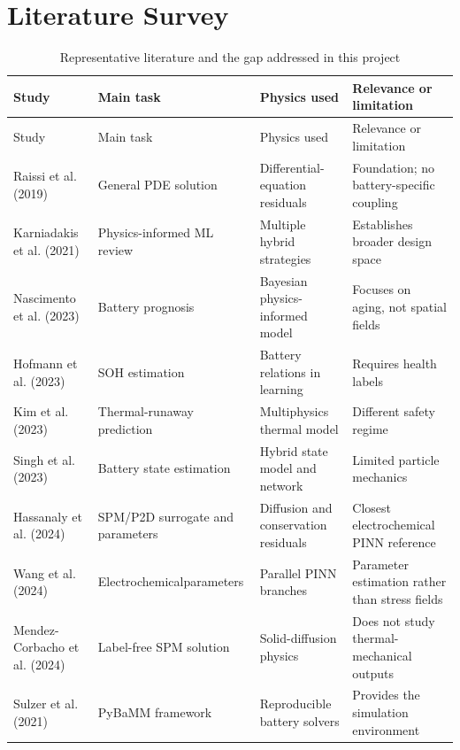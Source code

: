 \documentclass[14pt,a4paper,oneside]{extreport}
\renewcommand{\arraystretch}{1.25}
\begin{document}
\section{Literature Survey}
\begingroup
\small
{}
\renewcommand{\arraystretch}{0.95}
\begin{longtable}{@{}>{\RaggedRight\arraybackslash}p{}>{\RaggedRight\arraybackslash}p{}>{\RaggedRight\arraybackslash}p{}>{\RaggedRight\arraybackslash}p{}@{}}
\caption{Representative literature and the gap addressed in this project}\\
\toprule
Study & Main task & Physics used & Relevance or limitation\\
\midrule
\endfirsthead
\toprule
Study & Main task & Physics used & Relevance or limitation\\
\midrule
\endhead
Raissi et al. (2019) & General PDE solution & Differential-equation residuals & Foundation; no battery-specific coupling\\
Karniadakis et al. (2021) & Physics-informed ML review & Multiple hybrid strategies & Establishes broader design space\\
Nascimento et al. (2023) & Battery prognosis & Bayesian physics-informed model & Focuses on aging, not spatial fields\\
Hofmann et al. (2023) & SOH estimation & Battery relations in learning & Requires health labels\\
Kim et al. (2023) & Thermal-runaway prediction & Multiphysics thermal model & Different safety regime\\
Singh et al. (2023) & Battery state estimation & Hybrid state model and network & Limited particle mechanics\\
Hassanaly et al. (2024) & SPM/P2D surrogate and parameters & Diffusion and conservation residuals & Closest electrochemical PINN reference\\
Wang et al. (2024) & Electrochemical\newline parameters & Parallel PINN branches & Parameter estimation rather than stress fields\\
Mendez-Corbacho et al. (2024) & Label-free SPM solution & Solid-diffusion physics & Does not study thermal-mechanical outputs\\
Sulzer et al. (2021) & PyBaMM framework & Reproducible battery solvers & Provides the simulation environment\\
\bottomrule
\end{longtable}
\endgroup
\end{document}
